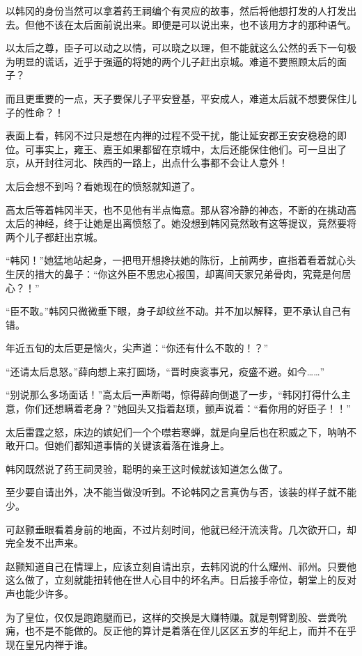以韩冈的身份当然可以拿着药王祠编个有灵应的故事，然后将他想打发的人打发出去。但他不该在太后面前说出来。即便是可以说出来，也不该用方才的那种语气。

以太后之尊，臣子可以动之以情，可以晓之以理，但不能就这么公然的丢下一句极为明显的谎话，近乎于强逼的将她的两个儿子赶出京城。难道不要照顾太后的面子？

而且更重要的一点，天子要保儿子平安登基，平安成人，难道太后就不想要保住儿子的性命？！

表面上看，韩冈不过只是想在内禅的过程不受干扰，能让延安郡王安安稳稳的即位。可事实上，雍王、嘉王如果都留在京城中，太后还能保住他们。可一旦出了京，从开封往河北、陕西的一路上，出点什么事都不会让人意外！

太后会想不到吗？看她现在的愤怒就知道了。

高太后等着韩冈半天，也不见他有半点悔意。那从容冷静的神态，不断的在挑动高太后的神经，终于让她是出离愤怒了。她没想到韩冈竟然敢有这等提议，竟然要将两个儿子都赶出京城。

“韩冈！”她猛地站起身，一把甩开想搀扶她的陈衍，上前两步，直指着看着就心头生厌的措大的鼻子：“你这外臣不思忠心报国，却离间天家兄弟骨肉，究竟是何居心？！”

“臣不敢。”韩冈只微微垂下眼，身子却纹丝不动。并不加以解释，更不承认自己有错。

年近五旬的太后更是恼火，尖声道：“你还有什么不敢的！？”

“还请太后息怒。”薛向想上来打圆场，“晋时庾衮事兄，疫盛不避。如今……”

“别说那么多场面话！”高太后一声断喝，惊得薛向倒退了一步，“韩冈打得什么主意，你们还想瞒着老身？”她回头又指着赵顼，颤声说着：“看你用的好臣子！！”

太后雷霆之怒，床边的嫔妃们一个个噤若寒蝉，就是向皇后也在积威之下，呐呐不敢开口。但她们都知道事情的关键该着落在谁身上。

韩冈既然说了药王祠灵验，聪明的亲王这时候就该知道怎么做了。

至少要自请出外，决不能当做没听到。不论韩冈之言真伪与否，该装的样子就不能少。

可赵颢垂眼看着身前的地面，不过片刻时间，他就已经汗流浃背。几次欲开口，却完全发不出声来。

赵颢知道自己在情理上，应该立刻自请出京，去韩冈说的什么耀州、祁州。只要他这么做了，立刻就能扭转他在世人心目中的坏名声。日后接手帝位，朝堂上的反对声也能少许多。

为了皇位，仅仅是跑跑腿而已，这样的交换是大赚特赚。就是刳臂割股、尝粪吮痈，也不是不能做的。反正他的算计是着落在侄儿区区五岁的年纪上，而并不在乎现在皇兄内禅于谁。

